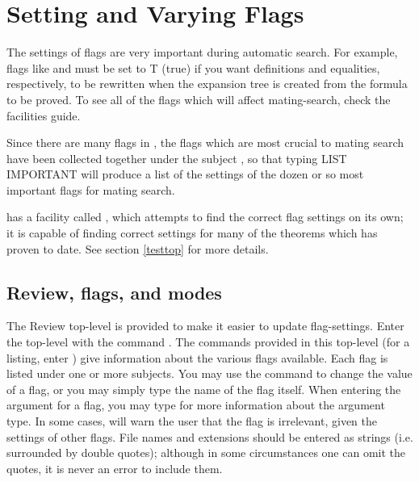 \chapter{Setting and Varying Flags}
\label{flags}






The settings of flags are very important during automatic search.  For
example, flags like  and
 must be set to T (true) if you want
definitions and equalities, respectively, to be rewritten when the
expansion tree is created from the formula to be proved.  To see all
of the flags which will affect mating-search, check the facilities
guide.

Since there are many flags in {\TPS}, the flags which are most crucial
to mating search have been collected together under the subject
, so that typing LIST IMPORTANT will produce a
list of the settings of the dozen or so most important flags for
mating search.

{\TPS} has a facility called ,
which attempts to find the correct flag settings
on its own; it is capable of finding correct settings for many of the theorems
which {\TPS} has proven to date. See section \ref{testtop} for more details.


\section{Review, flags, and modes}


The Review top-level is provided to make it easier to update flag-settings.
Enter the top-level with the command .  The commands provided
in this top-level (for a listing, enter ) give information about the
various flags available.  Each flag is listed under one or more subjects.
You may use the command  to change the value of a flag, or
you may simply type the name of the flag itself. When entering the argument for
a flag, you may type  for more information about the argument
type. In some cases, {\TPS} will warn the user that the flag is irrelevant, given
the settings of other flags.
File names and extensions should be entered as strings (i.e. surrounded
by double quotes); although in some circumstances one can omit the quotes, it
is never an error to include them.

